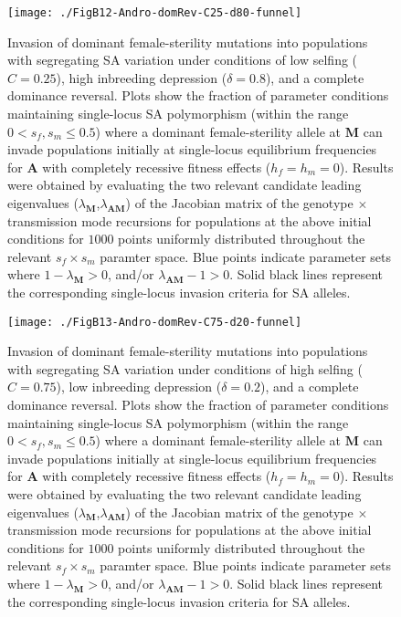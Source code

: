 \documentclass{article}
\begin{document}
\begin{figure}[ht!]
\centering
\texttt{[image: ./FigB12-Andro-domRev-C25-d80-funnel]}
\caption{Invasion of dominant female-sterility mutations into populations with segregating SA variation under conditions of low selfing ($C = 0.25$), high inbreeding depression ($\delta = 0.8$), and a complete dominance reversal. Plots show the fraction of parameter conditions maintaining single-locus SA polymorphism (within the range $0 < s_f,s_m \leq 0.5$) where a dominant female-sterility allele at $\mathbf{M}$ can invade populations initially at single-locus equilibrium frequencies for $\mathbf{A}$ with completely recessive fitness effects ($h_f=h_m=0$). Results were obtained by evaluating the two relevant candidate leading eigenvalues ($\lambda_{\mathbf{M}}$,$\lambda_{\mathbf{AM}}$) of the Jacobian matrix of the genotype $\times$ transmission mode recursions for populations at the above initial conditions for $1000$ points uniformly distributed throughout the relevant $s_f \times s_m$ paramter space. Blue points indicate parameter sets where $1 - \lambda_{\mathbf{M}} > 0$, and/or $\lambda_{\mathbf{AM}} - 1 > 0$. Solid black lines represent the corresponding single-locus invasion criteria for SA alleles.}
\label{fig:AndC25d80FunnelDomRev}
\end{figure}
\newpage{}

\begin{figure}[ht!]
\centering
\texttt{[image: ./FigB13-Andro-domRev-C75-d20-funnel]}
\caption{Invasion of dominant female-sterility mutations into populations with segregating SA variation under conditions of high selfing ($C = 0.75$), low inbreeding depression ($\delta = 0.2$), and a complete dominance reversal. Plots show the fraction of parameter conditions maintaining single-locus SA polymorphism (within the range $0 < s_f,s_m \leq 0.5$) where a dominant female-sterility allele at $\mathbf{M}$ can invade populations initially at single-locus equilibrium frequencies for $\mathbf{A}$ with completely recessive fitness effects ($h_f=h_m=0$). Results were obtained by evaluating the two relevant candidate leading eigenvalues ($\lambda_{\mathbf{M}}$,$\lambda_{\mathbf{AM}}$) of the Jacobian matrix of the genotype $\times$ transmission mode recursions for populations at the above initial conditions for $1000$ points uniformly distributed throughout the relevant $s_f \times s_m$ paramter space. Blue points indicate parameter sets where $1 - \lambda_{\mathbf{M}} > 0$, and/or $\lambda_{\mathbf{AM}} - 1 > 0$. Solid black lines represent the corresponding single-locus invasion criteria for SA alleles.}
\label{fig:AndC75d20FunnelDomRev}
\end{figure}
\newpage{}
\end{document}
